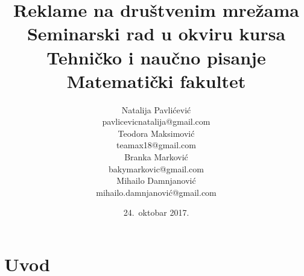 \documentclass[a4paper]{article}
\title{Reklame na društvenim mrežama\\ \small{Seminarski rad u okviru kursa\\Tehničko i naučno pisanje\\ Matematički fakultet}}
\author{Natalija Pavlićević\\ pavlicevicnatalija@gmail.com\\ Teodora Maksimović\\ teamax18@gmail.com\\ Branka Marković\\ bakymarkovic@gmail.com\\ Mihailo Damnjanović\\ mihailo.damnjanović@gmail.com}
\date{24.~oktobar 2017.}
\begin{document}
	
\section{Uvod}
\label{sec:uvod}
	
	
\end{document}
